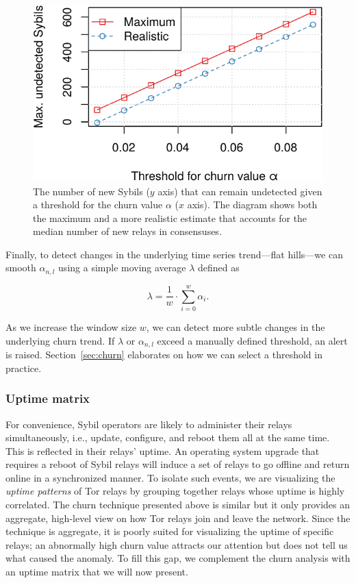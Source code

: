 \begin{figure}[t]
	\centering
	\includegraphics[width=0.8\linewidth]{diagrams/churn-sensitivity.pdf}
	\caption{The number of new Sybils ($y$ axis) that can remain undetected
	given a threshold for the churn value $\alpha$ ($x$ axis).  The diagram
	shows both the maximum and a more realistic estimate that accounts for the
	median number of new relays in consensuses.}
	\label{fig:churn-sensitivity}
\end{figure}

Finally, to detect changes in the underlying time series trend---flat hills---we
can smooth $\alpha_{n,l}$ using a simple moving average $\lambda$ defined as

\begin{equation}
\lambda = \frac{1}{w} \cdot \sum_{i=0}^{w} \alpha_{i}.
\end{equation}

As we increase the window size $w$, we can detect more subtle changes in the
underlying churn trend.  If $\lambda$ or $\alpha_{n,l}$ exceed a manually
defined threshold, an alert is raised.  Section~\ref{sec:churn} elaborates on
how we can select a threshold in practice.

\subsubsection{Uptime matrix}
\label{sec:uptime-matrix}
For convenience, Sybil operators are likely to administer their relays
simultaneously, i.e., update, configure, and reboot them all at the same time.
This is reflected in their relays' uptime.  An operating system upgrade that
requires a reboot of Sybil relays will induce a set of relays to go offline and
return online in a synchronized manner.  To isolate such events, we are
visualizing the \emph{uptime patterns} of Tor relays by grouping together relays
whose uptime is highly correlated.  The churn technique presented above is
similar but it only provides an aggregate, high-level view on how Tor relays
join and leave the network.  Since the technique is aggregate, it is poorly
suited for visualizing the uptime of specific relays; an abnormally high churn
value attracts our attention but does not tell us what caused the anomaly.  To
fill this gap, we complement the churn analysis with an uptime matrix that we
will now present.


